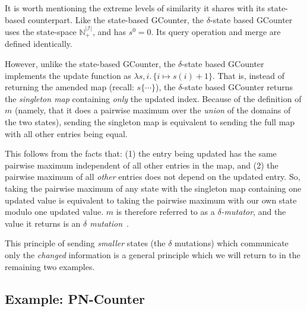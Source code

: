It is worth mentioning the extreme levels of similarity it shares with its
state-based counterpart. Like the state-based GCounter, the $\delta$-state based
GCounter uses the state-space $\mathbb{N}^{|\mathcal{I}|}_+$, and has $s^0 = 0$.
Its query operation and merge are defined identically.

However, unlike the state-based GCounter, the $\delta$-state based GCounter
implements the update function as $\lambda s,i.\, \{ i \mapsto s(i) + 1\}$. That
is, instead of returning the amended map (recall: $s\{ \cdots \}$), the
$\delta$-state based GCounter returns the \emph{singleton map} containing
\emph{only} the updated index. Because of the definition of $m$ (namely, that it
does a pairwise maximum over the \emph{union} of the domains of the two states),
sending the singleton map is equivalent to sending the full map with all other
entries being equal.

This follows from the facts that: (1) the entry being updated has the same
pairwise maximum independent of all other entries in the map, and (2) the
pairwise maximum of all \emph{other} entries does not depend on the updated
entry. So, taking the pairwise maximum of any state with the singleton map
containing one updated value is equivalent to taking the pairwise maximum with
our own state modulo one updated value. $m$ is therefore referred to as a
\emph{$\delta$-mutator}, and the value it returns is an \emph{$\delta$
mutation}~\citep{almedia18}.

This principle of sending \emph{smaller} states (the $\delta$ mutations) which
communicate only the \emph{changed} information is a general principle which
we will return to in the remaining two examples.

\subsection{Example: PN-Counter}
\label{sec:example-pncounter}


